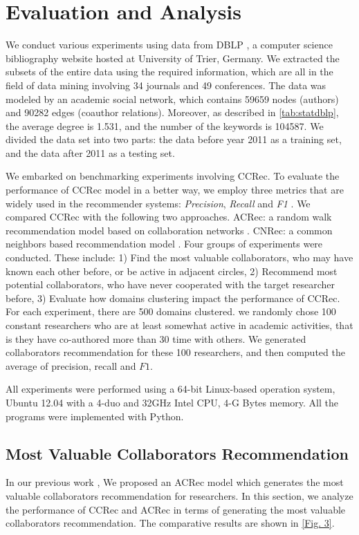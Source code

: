\documentclass[10pt]{article}
\begin{document}
\section*{Evaluation and Analysis}
We conduct various experiments using data from DBLP \cite{Ley:DBLP}, a computer science bibliography website hosted at University of Trier, Germany. We extracted the subsets of the entire data using the required information, which are all in the field of data mining involving 34 journals and 49 conferences. The data was modeled by an academic social network, which contains 59659 nodes (authors) and 90282 edges (coauthor relations). Moreover, as described in \autoref{tab:statdblp}, the average degree is 1.531, and the number of the keywords is 104587. We divided the data set into two parts: the data before year 2011 as a training set, and the data after 2011 as a testing set.

We embarked on benchmarking experiments involving CCRec. To evaluate the performance of CCRec model in a better way, we employ three metrics that are widely used in the recommender systems: \emph{Precision}, \emph{Recall} and \emph{F1} \cite{shani2011evaluating}. We compared CCRec with the following two approaches. ACRec: a random walk recommendation model based on collaboration networks \cite{li2014acrec}. CNRec: a common neighbors based recommendation model \cite{lopes2010collaboration}. Four groups of experiments were conducted. These include: 1) Find the most valuable collaborators, who may have known each other before, or be active in adjacent circles, 2) Recommend most potential collaborators, who have never cooperated with the target researcher before, 3) Evaluate how domains clustering impact the performance of CCRec. For each experiment, there are 500 domains clustered. we randomly chose 100 constant researchers who are at least somewhat active in academic activities, that is they have co-authored more than 30 time with others. We generated collaborators recommendation for these 100 researchers, and then computed the average of precision, recall and $F1$.


All experiments were performed using a 64-bit Linux-based operation system, Ubuntu 12.04 with a 4-duo and 32GHz Intel CPU, 4-G Bytes memory. All the programs were implemented with Python.

\subsection*{Most Valuable Collaborators Recommendation}
In our previous work \cite{li2014acrec}, We proposed an ACRec model which generates the most valuable collaborators recommendation for researchers. In this section, we analyze the performance of CCRec and ACRec in terms of generating the most valuable collaborators recommendation. The comparative results are shown in \autoref{Fig. 3}.
\end{document}
